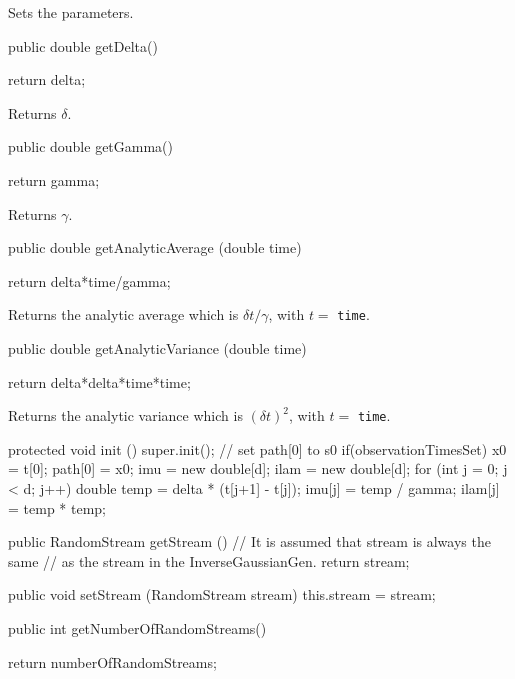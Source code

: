 \begin{tabb} Sets the parameters.
\end{tabb}
\begin{code}

   public double getDelta() \begin{hide} {
        return delta;
    }\end{hide}
\end{code}
\begin{tabb} Returns $\delta$.
\end{tabb}
\begin{code}

   public double getGamma() \begin{hide} {
        return gamma;
    }\end{hide}
\end{code}
\begin{tabb} Returns $\gamma$.
\end{tabb}
\begin{code}

   public double getAnalyticAverage (double time) \begin{hide} {
        return delta*time/gamma;
    }\end{hide}
\end{code}
\begin{tabb} Returns the analytic average which is $\delta t/ \gamma$,
   with $t=$ \texttt{time}.
\end{tabb}
\begin{code}

   public double getAnalyticVariance (double time) \begin{hide} {
        return delta*delta*time*time;
    }\end{hide}
\end{code}
\begin{tabb} Returns the analytic variance which is $(\delta  t)^2$,
   with $t=$ \texttt{time}.
\end{tabb}
\begin{code}\begin{hide}

    protected void init () {
        super.init(); // set path[0] to s0
        if(observationTimesSet){
            x0 = t[0];
            path[0] = x0;
            imu  = new double[d];
            ilam = new double[d];
            for (int j = 0; j < d; j++)
            {
                double temp = delta * (t[j+1] - t[j]);
                imu[j]  = temp / gamma;
                ilam[j] = temp * temp;
            }
        }
    }

   public RandomStream getStream () {
        // It is assumed that stream is always the same
        // as the stream in the InverseGaussianGen.
        return stream;
    }

   public void setStream (RandomStream stream) {
       this.stream = stream;
    }\end{hide}

   public int getNumberOfRandomStreams() \begin{hide} {
        return numberOfRandomStreams;
    }\end{hide}
\end{code}
